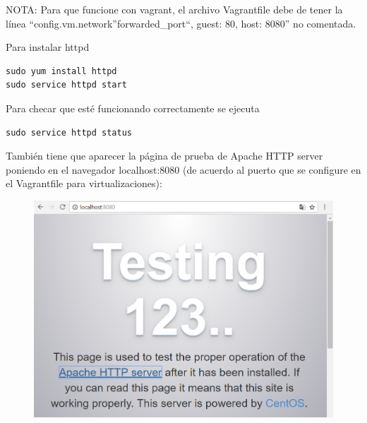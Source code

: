 \documentclass[]{article}
\begin{document}
NOTA: Para que funcione con vagrant, el archivo Vagrantfile debe de
tener la línea ``config.vm.network''forwarded\_port``, guest: 80, host:
8080'' no comentada.

Para instalar httpd

\begin{verbatim}
sudo yum install httpd
sudo service httpd start
\end{verbatim}

Para checar que esté funcionando correctamente se ejecuta

\begin{verbatim}
sudo service httpd status
\end{verbatim}

También tiene que aparecer la página de prueba de Apache HTTP server
poniendo en el navegador localhost:8080 (de acuerdo al puerto que se
configure en el Vagrantfile para virtualizaciones):

\begin{figure}[htbp]
\centering
\includegraphics{httpd.png}
\end{figure}
\end{document}
